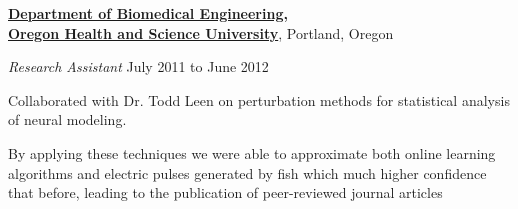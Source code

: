 \documentclass[10pt]{article}
\newenvironment{outerlist}[1][\enskip$\circ$]%
        {\begin{itemize}[#1]}{\end{itemize}%
         \vspace{-.6\baselineskip}}
\newenvironment{innerlist}[1][\enskip$\circ$]%
        {\begin{compactitem}[#1]}{\end{compactitem}}
\begin{document}
\bigbreak
\href{http://www.ogi.edu/bme}{\textbf{Department of Biomedical Engineering, \\Oregon Health and Science University}},
Portland, Oregon
\begin{outerlist}
\item[] \textit{Research Assistant}%
    \hfill {July 2011 to June 2012}
     \begin{innerlist}
     \item Collaborated with Dr. Todd Leen on perturbation methods for statistical analysis
of neural modeling.
     \item By applying these techniques we were able to approximate  both online learning algorithms and electric pulses generated by fish which much higher confidence that before, leading to the publication of peer-reviewed journal articles
     \end{innerlist}
   \end{outerlist}
  
\end{document}

